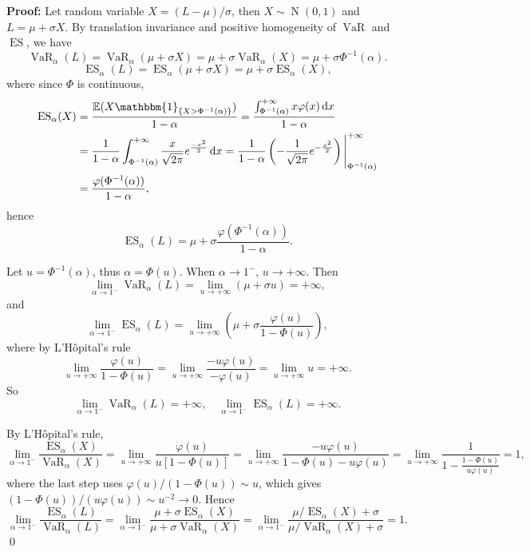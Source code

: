 \documentclass{MFM-hw} %
\newcommand{\VaR}{\operatorname{VaR}}
\newcommand{\ES}{\operatorname{ES}}
\newcommand{\normal}{\operatorname{N}}
\newcommand{\dd}{\,\mathrm{d}}
\newcommand{\E}{\mathbb{E}}
\begin{document}
\textbf{Proof: }Let random variable $X = (L - \mu)/\sigma$, then $X \sim \normal(0,1)$ and $L = \mu + \sigma X$. By translation invariance and positive homogeneity of $\VaR$ and $\ES$, we have
\[
    \VaR_{\alpha}(L) = \VaR_{\alpha}(\mu + \sigma X) = \mu + \sigma \VaR_{\alpha}(X) = \mu + \sigma \Phi^{-1}(\alpha).  
\]
\[
    \ES_{\alpha}(L) = \ES_{\alpha}(\mu + \sigma X) = \mu + \sigma \ES_{\alpha}(X),
\]
where since $\Phi$ is continuous,
\begin{align*}
    \ES_{\alpha}(X) &= \frac{\E(X\mathbbm{1}_{\{X > \Phi^{-1}(\alpha)\}})}{1-\alpha} = \frac{\int_{\Phi^{-1}(\alpha)}^{+\infty} x \varphi(x) \dd x}{1-\alpha} \\
    &= \frac{1}{1-\alpha} \int_{\Phi^{-1}(\alpha)}^{+\infty} \frac{x}{\sqrt{2\pi}}e^{\frac{-x^2}{2}} \dd x = \frac{1}{1-\alpha}\left(-\frac{1}{\sqrt{2\pi}}e^{-\frac{x^2}{2}}\right) \Bigg|_{\Phi^{-1}(\alpha)}^{+\infty}\\
    &= \frac{\varphi(\Phi^{-1}(\alpha))}{1-\alpha},
\end{align*}
hence
\[
    \ES_{\alpha}(L) = \mu + \sigma\frac{\varphi(\Phi^{-1}(\alpha))}{1-\alpha}.
\]

Let $u = \Phi^{-1}(\alpha)$, thus $\alpha = \Phi(u)$. When $\alpha \rightarrow 1^{-}$, $u \rightarrow +\infty$. Then
\[
    \lim\limits_{\alpha \rightarrow 1^{-}} \VaR_{\alpha}(L) = \lim\limits_{u \rightarrow +\infty} (\mu + \sigma u) = +\infty,
\]
and
\[
    \lim\limits_{\alpha \rightarrow 1^{-}} \ES_{\alpha}(L) = \lim\limits_{u \rightarrow +\infty} (\mu + \sigma \frac{\varphi(u)}{1-\Phi(u)}) ,
\]
where by L'Hôpital's rule
\[
     \lim\limits_{u \rightarrow +\infty}\frac{\varphi(u)}{1-\Phi(u)} = \lim\limits_{u \rightarrow +\infty}\frac{-u\varphi(u)}{-\varphi(u)} = \lim\limits_{u \rightarrow +\infty} u = +\infty.
\]
So
\[
    \lim\limits_{\alpha \rightarrow 1^{-}} \VaR_{\alpha}(L) = +\infty, \quad\lim\limits_{\alpha \rightarrow 1^{-}} \ES_{\alpha}(L) = +\infty.
\]

By L'Hôpital's rule,
\[
    \lim\limits_{\alpha \rightarrow 1^{-}} \frac{\ES_{\alpha}(X)}{\VaR_{\alpha}(X)} = \lim\limits_{u \rightarrow + \infty} \frac{\varphi(u)}{u[1-\Phi(u)]} = \lim\limits_{u \rightarrow + \infty} \frac{-u\varphi(u)}{1-\Phi(u)-u\varphi(u)} = \lim\limits_{u \rightarrow + \infty} \frac{1}{1-\frac{1-\Phi(u)}{u\varphi(u)}} = 1,
\]
where the last step uses $\varphi(u)/(1-\Phi(u)) \sim u$, which gives $(1-\Phi(u))/(u\varphi(u)) \sim u^{-2} \rightarrow 0$. Hence
\[
    \lim\limits_{\alpha \rightarrow 1^{-}} \frac{\ES_{\alpha}(L)}{\VaR_{\alpha}(L)} = \lim\limits_{\alpha \rightarrow 1^{-}}\frac{\mu + \sigma\ES_{\alpha}(X)}{\mu + \sigma \VaR_{\alpha}(X)} = \lim\limits_{\alpha \rightarrow 1^{-}}\frac{\mu/\ES_{\alpha}(X) + \sigma}{\mu/\VaR_{\alpha}(X) + \sigma} = 1.
\]\qed
\end{document}
